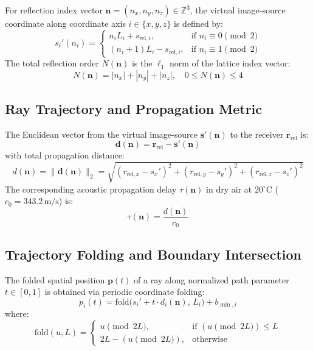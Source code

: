 \documentclass[11pt,a4paper]{article}
\begin{document}
For reflection index vector $\mathbf{n} = (n_x, n_y, n_z) \in \mathbb{Z}^3$, the virtual image-source coordinate along coordinate axis $i \in \{x, y, z\}$ is defined by:
\begin{equation}
s_{i}'(n_i) = \begin{cases}
n_i L_i + s_{\text{rel}, i}, & \text{if } n_i \equiv 0 \pmod 2 \\
(n_i + 1) L_i - s_{\text{rel}, i}, & \text{if } n_i \equiv 1 \pmod 2
\end{cases}
\end{equation}
The total reflection order $N(\mathbf{n})$ is the $\ell_1$ norm of the lattice index vector:
\begin{equation}
N(\mathbf{n}) = |n_x| + |n_y| + |n_z|, \quad 0 \le N(\mathbf{n}) \le 4
\end{equation}

\subsection{Ray Trajectory and Propagation Metric}
The Euclidean vector from the virtual image-source $\mathbf{s}'(\mathbf{n})$ to the receiver $\mathbf{r}_{\text{rel}}$ is:
\begin{equation}
\mathbf{d}(\mathbf{n}) = \mathbf{r}_{\text{rel}} - \mathbf{s}'(\mathbf{n})
\end{equation}
with total propagation distance:
\begin{equation}
d(\mathbf{n}) = \|\mathbf{d}(\mathbf{n})\|_2 = \sqrt{(r_{\text{rel}, x} - s_x')^2 + (r_{\text{rel}, y} - s_y')^2 + (r_{\text{rel}, z} - s_z')^2}
\end{equation}
The corresponding acoustic propagation delay $\tau(\mathbf{n})$ in dry air at $20^\circ\text{C}$ ($c_0 = 343.2\,\text{m/s}$) is:
\begin{equation}
\tau(\mathbf{n}) = \frac{d(\mathbf{n})}{c_0}
\end{equation}

\subsection{Trajectory Folding and Boundary Intersection}
The folded spatial position $\mathbf{p}(t)$ of a ray along normalized path parameter $t \in [0, 1]$ is obtained via periodic coordinate folding:
\begin{equation}
p_i(t) = \text{fold}\Big(s_i' + t \cdot d_i(\mathbf{n}),\, L_i\Big) + b_{\min, i}
\end{equation}
where:
\begin{equation}
\text{fold}(u, L) = \begin{cases}
u \pmod{2L}, & \text{if } (u \pmod{2L}) \le L \\
2L - (u \pmod{2L}), & \text{otherwise}
\end{cases}
\end{equation}
\end{document}
